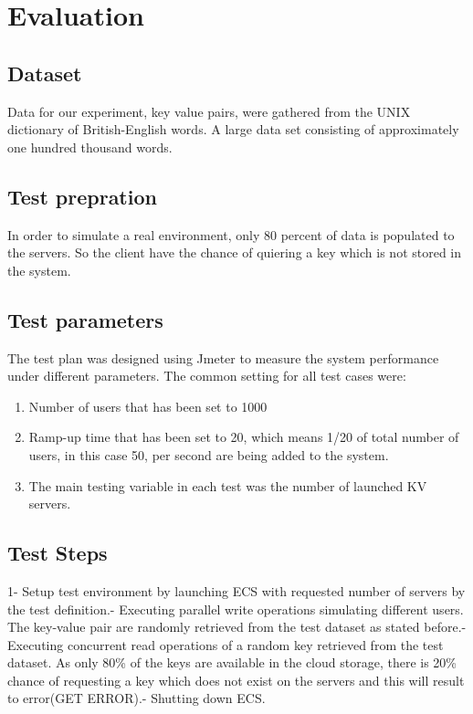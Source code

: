 \documentclass{sig-alternate}
\begin{document}
\section{Evaluation}
\subsection{Dataset}
Data for our experiment, key value pairs, were gathered from the UNIX dictionary of British-English words. A large data set consisting of approximately one hundred thousand words.
\subsection{Test prepration}
In order to simulate a real environment, only 80 percent of data is populated to the servers. So the client have the chance of quiering a key which is not stored in the system.

\subsection{Test parameters}
The test plan was designed using Jmeter to measure the system performance under different parameters. The common setting for all test cases were:
\begin{enumerate}
\item Number of users that has been set to 1000
\item Ramp-up time that has been set to 20, which means 1/20 of total number of users, in this case 50, per second are being added to the system.
\item The main testing variable in each test was the number of launched KV servers.
\end{enumerate}
		
\subsection{Test Steps}								 			
1-  Setup test environment by launching ECS with requested number of servers by the test definition.-  Executing parallel write operations simulating different users. The key-value pair are randomly retrieved from the test dataset as stated before.-  Executing concurrent read operations of a random key retrieved from the test dataset. As only 80\% of the keys are available in the cloud storage, there is 20\% chance of requesting a key which does not exist on the servers and this will result to error(GET ERROR).-  Shutting down ECS.	
			 					
\end{document}
